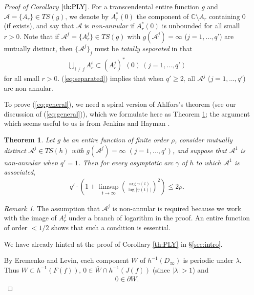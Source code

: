 \documentclass[a4paper,12pt]{amsart}
\theoremstyle{plain}
\newtheorem{theorem}[equation]{Theorem}
\theoremstyle{definition}
\theoremstyle{remark}
\newtheorem{remark}[equation]{Remark}
\numberwithin{equation}{section}
\begin{document}
\begin{proof}[Proof of Corollary $\ref{th:PLY}$]

For a transcendental entire function $g$ and $\mathcal{A}=\{A_r\}\in{\mathit{TS}}(g)$,
we denote by $A_r^*(0)$ the component of ${\mathbb{C}}\setminus A_r$ containing $0$
(if exists), and say that $\mathcal{A}$ is {\itshape non-annular} if
$A_r^*(0)$ is unbounded for all small $r>0$.
Note that if $\mathcal{A}^j=\{A_r^j\}\in{\mathit{TS}}(g)$
with $g(\mathcal{A}^j)=\infty$ ($j=1,\ldots,q'$) are mutually distinct,
then $\{\mathcal{A}^j\}_j$ must be {\itshape totally separated} in that 
\begin{gather}
 \bigcup_{i\neq j}A_r^i\subset (A_r^j)^*(0)\ (j=1,\ldots,q')\label{eq:separated} 
\end{gather}
for all small $r>0$. (\ref{eq:separated}) implies that when $q'\geq 2$,
all $\mathcal{A}^j$ ($j=1,\ldots,q'$) are non-annular.

To prove (\ref{eq:general}), we need a spiral version of Ahlfors's theorem
(see our discussion of (\ref{eq:general})),
which we formulate here as Theorem \ref{th:spiral};
the argument which seems useful to us is from Jenkins \cite[\S 3]{Jenkins87}
and Hayman \cite[Theorem 8.21]{Hayman89}.

\begin{theorem}\label{th:spiral}
 Let $g$ be an entire function of finite order $\rho$,
 consider mutually distinct $\mathcal{A}^j\in{\mathit{TS}}(h)$ with $g(\mathcal{A}^j)=\infty$
 $(j=1,\ldots,q')$, and suppose that $\mathcal{A}^1$ is non-annular when $q'=1$.
 Then for every asymptotic arc $\gamma$ of $h$ to which $\mathcal{A}^1$ is associated,
 \begin{gather}
  q'\cdot\left(1+\limsup_{t\to\infty}\left(\frac{\arg\gamma(t)}{\log|\gamma(t)|}\right)^2\right)\le 2\rho.\label{eq:spiralinfinite}
 \end{gather}
\end{theorem}

\begin{remark}
 The assumption that $\mathcal{A}^j$ is non-annular
 is required because we work with the image of $A_r^j$
 under a branch of logarithm in the proof. 
 An entire function of order $<1/2$ shows that such a condition is essential.
\end{remark} 

We have already hinted at the proof of Corollary \ref{th:PLY} in \S \ref{sec:intro}.

By Eremenko and Levin, 
each component $W$ of $h^{-1}(D_{\infty})$ is periodic under $\lambda$. 
Thus $W\subset h^{-1}(F(f))$, $0\in\overline{W}\cap h^{-1}(J(f))$
(since $|\lambda|>1$) and
\begin{gather}
 0\in\partial W.\label{eq:boundary} 
\end{gather}


\end{proof}
\end{document}
